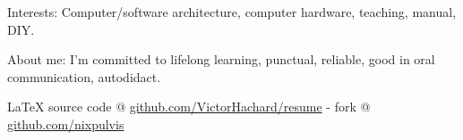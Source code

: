 \documentclass[10pt,a4paper]{article}
\newcommand{\latex}{\LaTeX\xspace}
\newenvironment{indentsection}[1]
{\begin{list}{}
  {\setlength{\leftmargin}{#1}} \item[]
}
{\end{list}}
\begin{document}
\begin{indentsection}{\parindent}
\begin{description*}
\item[Interests:]
  Computer/software architecture, computer hardware, teaching,
  manual, DIY.
\item[About me:]
  I’m committed to lifelong learning, punctual, reliable,
  good in oral communication, autodidact.
\end{description*}
\end{indentsection}


\begin{center}
\footnotesize \latex source code @
\href{http://www.github.com/VictorHachard/resume}
{github.com/VictorHachard/resume} - fork @
\href{http://www.github.com/nixpulvis}
{github.com/nixpulvis}
\end{center}
\end{document}
